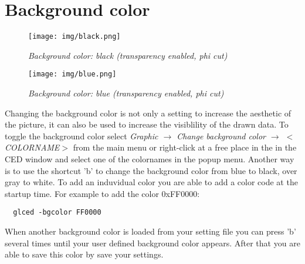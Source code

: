 \documentclass[a4paper,10pt]{article}
\begin{document}
\section{Background color}
\begin{figure}
\begin{minipage}[t]{6cm}
\centerline{\texttt{[image: img/black.png]}}
\caption{\label{CEDViewer} \textsl{Background color: black (transparency enabled, phi cut)}}
\end{minipage}
\hfill
\begin{minipage}[t]{6cm}
\setlength{\fboxsep}{0mm}
\centerline{\texttt{[image: img/blue.png]}}
\caption{\label{User viewer}\textsl{Background color: blue (transparency enabled, phi cut)}}
\end{minipage}
\end{figure}

Changing the background color is not only a setting to increase the aesthetic of the picture, it can also be used to increase the visiblility of the drawn data.
To toggle the background color select \textit{Graphic $\to$ Change background color $\to$ $<$COLORNAME$>$} from the main menu or right-click at a free place in the in the CED window and select one of the colornames in the popup menu.  
Another way is to use the shortcut 'b' to change the background color from blue to black, over gray to white.
To add an induvidual color you are able to add a color code at the startup time. 
For example to add the color 0xFF0000: 
\begin{verbatim}
  glced -bgcolor FF0000 
\end{verbatim}
When another background color is loaded from your setting file you can press 'b' several times until your user defined background color appears. 
After that you are able to save this color by save your settings. 



%
\end{document}
